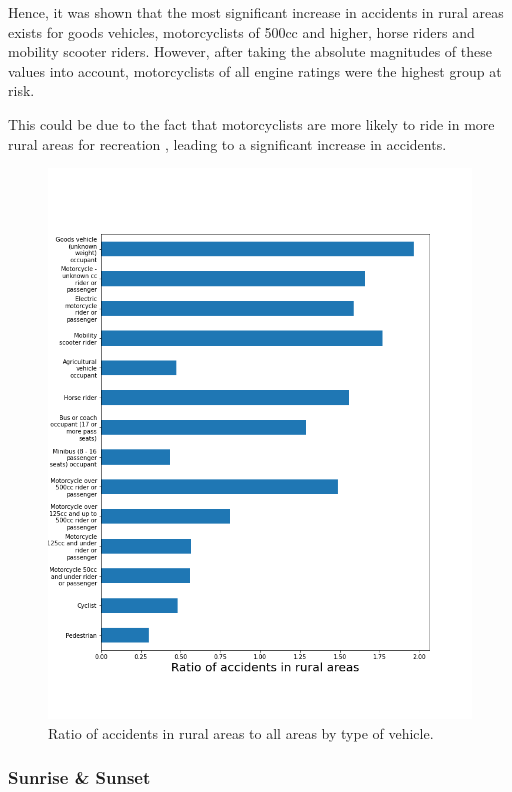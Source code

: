 \documentclass[12pt]{article}
\begin{document}
Hence, it was shown that the most significant increase in accidents in rural areas exists for goods vehicles, motorcyclists of 500cc and higher, horse riders and mobility scooter riders. However, after taking the absolute magnitudes of these values into account, motorcyclists of all engine ratings were the highest group at risk.

This could be due to the fact that motorcyclists are more likely to ride in more rural areas for recreation \parencite{motorcycle}, leading to a significant increase in accidents.

\begin{figure}[hbtp]
\centering     %
\includegraphics[width=0.65\paperwidth]{casualty_rural}
\caption{Ratio of accidents in rural areas to all areas by type of vehicle.}
\label{vehicle-rural}
\end{figure}


\newpage

\newpage

\subsubsection{Sunrise \& Sunset}
\end{document}
